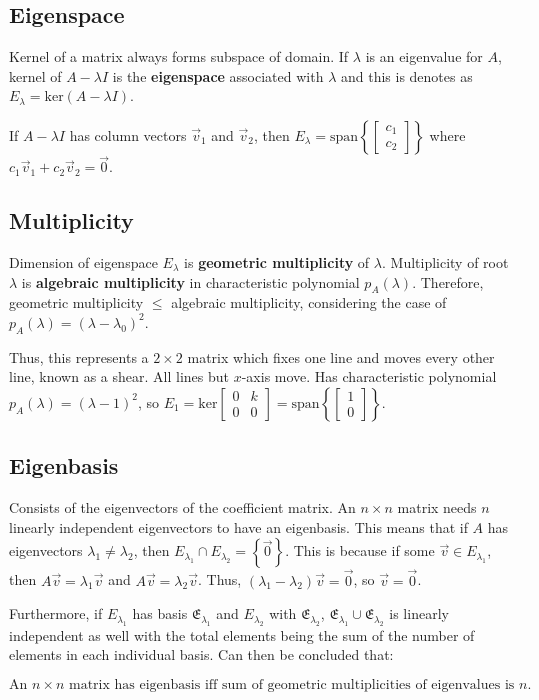 \subsection{Eigenspace}

Kernel of a matrix always forms subspace of domain. If $\lambda$ is an eigenvalue for $A$,
kernel of $A-\lambda I$ is the \textbf{eigenspace} associated with $\lambda$ and 
this is denotes as $E_\lambda=\mathrm{ker}(A-\lambda I)$.

If $A-\lambda I$ has column vectors $\vec{v}_1$ and $\vec{v}_2$, then 
$E_\lambda=\mathrm{span}\left\{\begin{bmatrix}c_1\\c_2\end{bmatrix}\right\}$ where $c_1\vec{v}_1+c_2\vec{v}_2=\vec{0}$.

\subsection{Multiplicity}

Dimension of eigenspace $E_\lambda$ is \textbf{geometric multiplicity} of $\lambda$.
Multiplicity of root $\lambda$ is \textbf{algebraic multiplicity} in characteristic polynomial $p_A(\lambda)$.
Therefore, geometric multiplicity $\leq$ algebraic multiplicity, considering the case of $p_A(\lambda)=(\lambda-\lambda_0)^2$.

Thus, this represents a $2\times 2$ matrix which fixes one line and moves every other line, known as a shear. All lines but $x$-axis move.
Has characteristic polynomial $p_A(\lambda)=(\lambda-1)^2$, so $E_1=\mathrm{ker}\begin{bmatrix}0&k\\0&0\end{bmatrix}=\mathrm{span}\left\{\begin{bmatrix}1\\0\end{bmatrix}\right\}$.

\subsection{Eigenbasis}

Consists of the eigenvectors of the coefficient matrix. An $n\times n$ matrix needs $n$ linearly independent
eigenvectors to have an eigenbasis. This means that if $A$ has eigenvectors $\lambda_1\neq\lambda_2$, then $E_{\lambda_1}\cap E_{\lambda_2}=\left\{\vec{0}\right\}$.
This is because if some $\vec{v}\in E_{\lambda_1}$, then $A\vec{v}=\lambda_1\vec{v}$ and $A\vec{v}=\lambda_2\vec{v}$.
Thus, $(\lambda_1-\lambda_2)\vec{v}=\vec{0}$, so $\vec{v}=\vec{0}$.

\noindent
Furthermore, if $E_{\lambda_1}$ has basis $\mathfrak{E}_{\lambda_1}$ and $E_{\lambda_2}$ with $\mathfrak{E}_{\lambda_2}$, $\mathfrak{E}_{\lambda_1}\cup \mathfrak{E}_{\lambda_2}$ is linearly independent as well 
with the total elements being the sum of the number of elements in each individual basis.
Can then be concluded that:

$$
\boxed{\text{An $n\times n$ matrix has eigenbasis iff sum of geometric multiplicities of eigenvalues is $n$.}}
$$